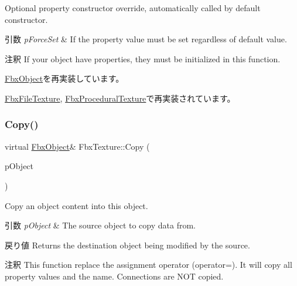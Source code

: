 Optional property constructor override, automatically called by default constructor. 
\begin{DoxyParams}{引数}
{\em p\+Force\+Set} & If the property value must be set regardless of default value. \\
\hline
\end{DoxyParams}
\begin{DoxyRemark}{注釈}
If your object have properties, they must be initialized in this function. 
\end{DoxyRemark}


\hyperlink{class_fbx_object_ad44f814323dc1b5e78bff1bfc608b4bb}{Fbx\+Object}を再実装しています。



\hyperlink{class_fbx_file_texture_a698164ee49ac5fb2a5d5e3e7a2cb9e9f}{Fbx\+File\+Texture}, \hyperlink{class_fbx_procedural_texture_ae718dfc2092f735a1b6bcd724029a36c}{Fbx\+Procedural\+Texture}で再実装されています。

\mbox{\label{class_fbx_texture_a321c23c2dc2e91c58e2fcc2ed7d29f9e}} 
\subsubsection{\texorpdfstring{Copy()}{Copy()}}
{\footnotesize\ttfamily virtual \hyperlink{class_fbx_object}{Fbx\+Object}\& Fbx\+Texture\+::\+Copy (\begin{DoxyParamCaption}\item[{const \hyperlink{class_fbx_object}{Fbx\+Object} \&}]{p\+Object }\end{DoxyParamCaption})\hspace{0.3cm}{\ttfamily [virtual]}}

Copy an object content into this object. 
\begin{DoxyParams}{引数}
{\em p\+Object} & The source object to copy data from. \\
\hline
\end{DoxyParams}
\begin{DoxyReturn}{戻り値}
Returns the destination object being modified by the source. 
\end{DoxyReturn}
\begin{DoxyRemark}{注釈}
This function replace the assignment operator (operator=). It will copy all property values and the name. Connections are N\+OT copied. 
\end{DoxyRemark}


